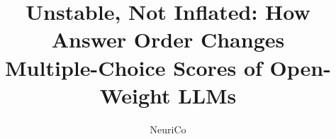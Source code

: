 \documentclass{article}
\title{Unstable, Not Inflated: How Answer Order Changes\\ Multiple-Choice Scores of Open-Weight LLMs}
\author{NeuriCo}
\begin{document}
\maketitle

\begin{abstract}

\end{abstract}










\appendix

\end{document}

